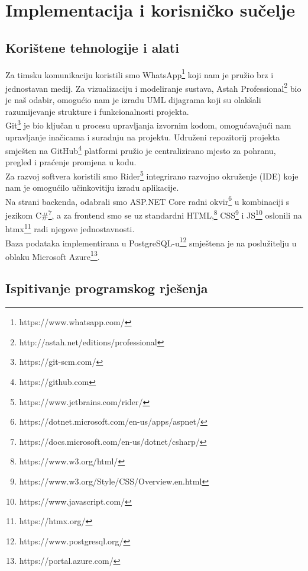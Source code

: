 \chapter{Implementacija i korisničko sučelje}
		
		
		\section{Korištene tehnologije i alati}
		
			
			 
			 Za timsku komunikaciju koristili smo WhatsApp\footnote{https://www.whatsapp.com/} koji nam je pružio brz i jednostavan medij. Za vizualizaciju i modeliranje sustava, Astah Professional\footnote{http://astah.net/editions/professional} bio je naš odabir, omogućio nam je izradu UML dijagrama koji su olakšali razumijevanje strukture i funkcionalnosti projekta.\\
			 
			 Git\footnote{https://git-scm.com/} je bio ključan u procesu upravljanja izvornim kodom, omogućavajući nam upravljanje inačicama i suradnju na projektu. Udruženi repozitorij projekta smješten na GitHub\footnote{https://github.com} platformi pružio je centralizirano mjesto za pohranu, pregled i praćenje promjena u kodu.\\
			 
			 Za razvoj softvera koristili smo Rider\footnote{https://www.jetbrains.com/rider/} integrirano razvojno okruženje (IDE) koje nam je omogućilo učinkovitiju izradu aplikacije.\\
			 
			 Na strani backenda, odabrali smo ASP.NET Core radni okvir\footnote{https://dotnet.microsoft.com/en-us/apps/aspnet/} u kombinaciji s jezikom C\#\footnote{https://docs.microsoft.com/en-us/dotnet/csharp/}, a za frontend smo se uz standardni HTML,\footnote{https://www.w3.org/html/} CSS\footnote{https://www.w3.org/Style/CSS/Overview.en.html} i JS\footnote{https://www.javascript.com/} oslonili na htmx\footnote{https://htmx.org/} radi njegove jednostavnosti.\\
			 
			 Baza podataka implementirana u PostgreSQL-u\footnote{https://www.postgresql.org/} smještena je na poslužitelju u oblaku Microsoft Azure\footnote{https://portal.azure.com/}.\newline
			
			
			\eject 
		
	
		\section{Ispitivanje programskog rješenja}
		
